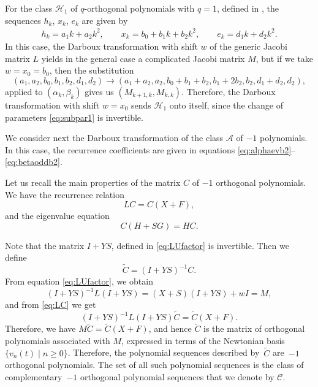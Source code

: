\documentclass[pdftex]{sigma}
\def\cA{\mathcal A}
\def\cC{\mathcal C}
\def\cH{\mathcal H}
\numberwithin{equation}{section}
\begin{document}
For the class $\cH_1$ of $q$-orthogonal polynomials with $q=1$, defined in \cite[Section~8]{Uni}, the sequences $h_k$, $x_k$, $e_k$ are given by
\begin{gather*} %
h_k= a_1 k+ a_2 k^2, \qquad
x_k= b_0 + b_1 k + b_2 k^2, \qquad
e_k= d_1 k + d_2 k^2.
\end{gather*}
In this case, the Darboux transformation with shift $w$ of the generic Jacobi matrix $L$ yields in the general case a complicated Jacobi matrix $M$, but if we take $w=x_0=b_0$, then the substitution
\begin{equation}\label{eq:subpar1}
	( a_1,a_2, b_0, b_1, b_2, d_1, d_2)\rightarrow ( a_1+a_2, a_2, b_0+b_1+b_2, b_1+ 2 b_2, b_2, d_1+d_2, d_2),
\end{equation}
applied to $(\alpha_k, \beta_k)$ gives us $(M_{k+1,k}, M_{k,k})$.
Therefore, the Darboux transformation with shift $w=x_0$ sends $\cH_1$ onto itself, since the change of parameters \eqref{eq:subpar1} is invertible.

We consider next the Darboux transformation of the class $\cA$ of $-1$ polynomials. In this case, the recurrence coefficients are given in equations \eqref{eq:alphaevb2}--\eqref{eq:betaoddb2}.

Let us recall the main properties of the matrix $C$ of $-1$ orthogonal polynomials. We have the recurrence relation
\begin{equation}\label{eq:LC}
	LC=C(X+F),
\end{equation}
and the eigenvalue equation
\begin{equation}\label{eq:ChSg}
	C(H+ S G)=H C.
\end{equation}

Note that the matrix $I+YS$, defined in \eqref{eq:LUfactor} is invertible. Then we define
\begin{equation*}%
	\tilde C= (I+ YS)^{-1} C.
\end{equation*}
From equation \eqref{eq:LUfactor}, we obtain
\begin{equation*}
	(I +YS)^{-1} L (I+YS)= (X+S) ( I+YS) + wI=M,
\end{equation*}
and from \eqref{eq:LC} we get
\begin{equation*}
	(I+YS)^{-1} L (I+YS) \tilde C = \tilde C ( X+F).
\end{equation*}
Therefore, we have
$%
M \tilde C= \tilde C (X+F)$,
and hence $\tilde C$ is the matrix of orthogonal polynomials associated with $M$, expressed in terms of the Newtonian basis $\{v_n(t)\mid n \ge 0\}$.
Therefore, the polynomial sequences described by~$\tilde C$ are~$-1$ orthogonal polynomials. The set of all such polynomial sequences is the class of complementary~$-1$ orthogonal polynomial sequences that we denote by $\cC$.
\end{document}
